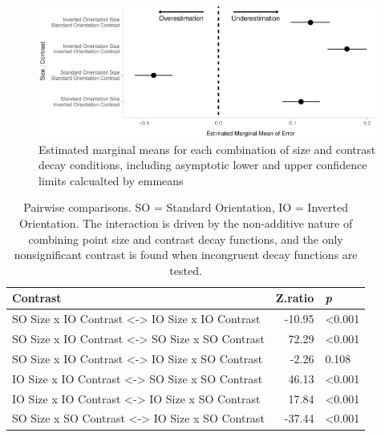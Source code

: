 \documentclass[manuscript, review, anonymous, screen]{acmart}
\begin{document}
\begin{figure}

{\centering \includegraphics[width=1\textwidth,height=\textheight]{size_and_contrast_new_files/figure-pdf/fig-emm-plot-1.pdf}

}

\caption{\label{fig-emm-plot}Estimated marginal means for each
combination of size and contrast decay conditions, including asymptotic
lower and upper confidence limits calcualted by emmeans}

\end{figure}

\hypertarget{tbl-contrasts}{}
\begin{table}
\caption{\label{tbl-contrasts}Pairwise comparisons. SO = Standard Orientation, IO = Inverted
Orientation. The interaction is driven by the non-additive nature of
combining point size and contrast decay functions, and the only
nonsignificant contrast is found when incongruent decay functions are
tested. }\tabularnewline

\centering
\begin{tabular}{lrl}
\toprule
Contrast & Z.ratio & \textit{p}\\
\midrule
SO Size x IO Contrast <-> IO Size x IO Contrast & -10.95 & <0.001\\
SO Size x IO Contrast <-> SO Size x SO Contrast & 72.29 & <0.001\\
SO Size x IO Contrast <-> IO Size x SO Contrast & -2.26 & 0.108\\
IO Size x IO Contrast <-> SO Size x SO Contrast & 46.13 & <0.001\\
IO Size x IO Contrast <-> IO Size x SO Contrast & 17.84 & <0.001\\
\addlinespace
SO Size x SO Contrast <-> IO Size x SO Contrast & -37.44 & <0.001\\
\bottomrule
\end{tabular}
\end{table}
\end{document}
